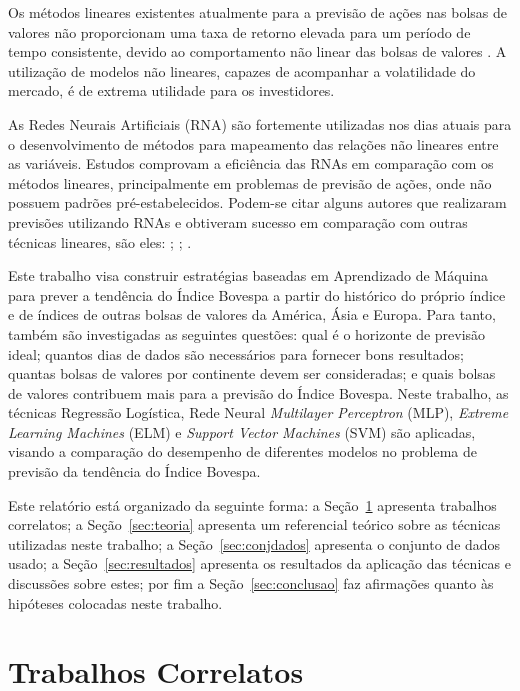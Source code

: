 \documentclass[12pt,a4paper,utf8]{ppgsi}
\begin{document}
Os métodos lineares existentes atualmente para a previsão de ações nas bolsas de valores não proporcionam uma taxa de retorno elevada para um período de tempo consistente, devido ao comportamento não linear das bolsas de valores \citep{de2006uso}. A utilização de modelos não lineares, capazes de acompanhar a volatilidade do mercado, é de extrema utilidade para os investidores.

As Redes Neurais Artificiais (RNA) são fortemente utilizadas nos dias atuais para o desenvolvimento de métodos para mapeamento das relações não lineares entre as variáveis. Estudos comprovam a eficiência das RNAs em comparação com os métodos lineares, principalmente em problemas de previsão de ações, onde não possuem padrões pré-estabelecidos. Podem-se citar alguns autores que realizaram previsões utilizando RNAs e obtiveram sucesso em comparação com outras técnicas lineares, são eles: \citep{bodis2004financial}; \citep{leung2000forecasting}; \citep{cho2003comparison}.

Este trabalho visa construir estratégias baseadas em Aprendizado de Máquina para prever a tendência do Índice Bovespa a partir do histórico do próprio índice e de índices de outras bolsas de valores da América, Ásia e Europa. Para tanto, também são investigadas as seguintes questões: qual é o horizonte de previsão ideal; quantos dias de dados são necessários para fornecer bons resultados; quantas bolsas de valores por continente devem ser consideradas; e quais bolsas de valores contribuem mais para a previsão do Índice Bovespa. Neste trabalho, as técnicas Regressão Logística, Rede Neural \textit{Multilayer Perceptron} (MLP), \textit{Extreme Learning Machines} (ELM) e \textit{Support Vector Machines} (SVM) são aplicadas, visando a comparação do desempenho de diferentes modelos no problema de previsão da tendência do Índice Bovespa.

Este relatório está organizado da seguinte forma: a Seção~\ref{sec:correlatos} apresenta trabalhos correlatos; a Seção~\ref{sec:teoria} apresenta um referencial teórico sobre as técnicas utilizadas neste trabalho; a Seção~\ref{sec:conjdados} apresenta o conjunto de dados usado; a Seção~\ref{sec:resultados} apresenta os resultados da aplicação das técnicas e discussões sobre estes; por fim a Seção~\ref{sec:conclusao} faz afirmações quanto às hipóteses colocadas neste trabalho.

\section{Trabalhos Correlatos} \label{sec:correlatos}
\end{document}
